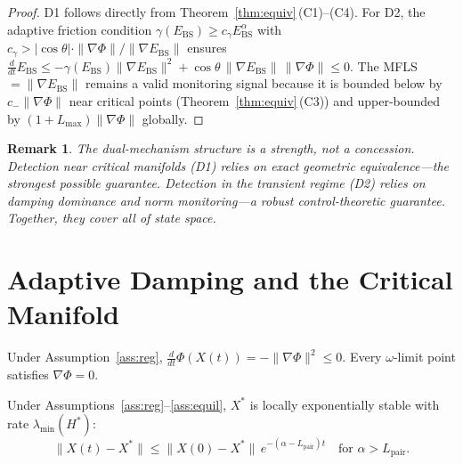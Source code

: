 \documentclass[final]{siamltex}
\newcommand{\norm}[1]{\lVert #1 \rVert}
\providecommand{\grad}{\nabla}
\newcommand{\Ebs}{E_{\mathrm{BS}}}
\newcommand{\Xst}{X^*}
\newcommand{\Lpair}{L_{\mathrm{pair}}}
\newcommand{\lmin}{\lambda_{\min}}
\newcommand{\ddt}{\tfrac{d}{dt}}
\newtheorem{remark}[theorem]{Remark}
\begin{document}
\begin{proof}
D1 follows directly from Theorem~\ref{thm:equiv}\,(C1)--(C4).
For D2, the adaptive friction condition
$\gamma(\Ebs)\ge c_\gamma\Ebs^\alpha$ with
$c_\gamma > |\cos\theta|\cdot\|\nabla\Phi\|/\|\nabla\Ebs\|$
ensures $\frac{d}{dt}\Ebs \le -\gamma(\Ebs)\|\nabla\Ebs\|^2 + \cos\theta\,\|\nabla\Ebs\|\,\|\nabla\Phi\| \le 0$.
The MFLS $= \|\nabla\Ebs\|$ remains a valid monitoring signal
because it is bounded below by $c_{-}\|\nabla\Phi\|$ near critical
points (Theorem~\ref{thm:equiv}\,(C3)) and upper-bounded by
$(1+L_{\max})\|\nabla\Phi\|$ globally.
\end{proof}

\begin{remark}
The dual-mechanism structure is a \emph{strength}, not a
concession. Detection near critical manifolds (D1) relies on exact
geometric equivalence---the strongest possible guarantee.
Detection in the transient regime (D2) relies on damping
dominance and norm monitoring---a robust control-theoretic
guarantee. Together, they cover all of state space.
\end{remark}


\section{Adaptive Damping and the Critical
Manifold}\label{sec:damping}

\begin{theorem}\label{thm:descent}
Under Assumption~\ref{ass:reg}, $\ddt\Phi(X(t))=
-\norm{\grad\Phi}^2\le 0$. Every $\omega$-limit point satisfies
$\grad\Phi=0$.
\end{theorem}

\begin{theorem}\label{thm:las}
Under Assumptions~\ref{ass:reg}--\ref{ass:equil}, $\Xst$ is
locally exponentially stable with rate $\lmin(H^*)$:
\[
  \norm{X(t)-\Xst}\le\norm{X(0)-\Xst}\,e^{-(\alpha-\Lpair)t}
  \quad\text{for }\alpha>\Lpair.
\]
\end{theorem}
\end{document}

